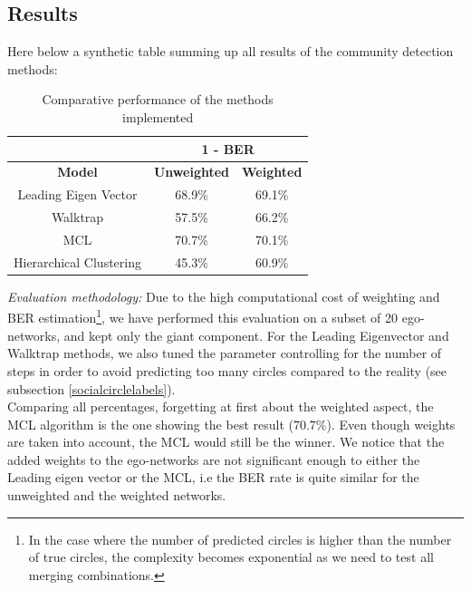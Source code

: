 \documentclass[11pt]{article}       %
\begin{document}
\subsection{Results}
Here below a synthetic table summing up all results of the community detection methods:

\begin{table}[H]
\centering
\begin{tabular}{c|c|c|}
\cline{2-3}
                                                    & \multicolumn{2}{c|}{\textbf{1 - BER}} \\ \hline
\multicolumn{1}{|c|}{\textbf{Model}}                         & \textbf{Unweighted}   & \textbf{Weighted}  \\ \hline
\multicolumn{1}{|c|}{Leading Eigen Vector}          & 68.9\%       & 69.1\%    \\ \hline
\multicolumn{1}{|c|}{Walktrap}                      & 57.5\%       & 66.2\%    \\ \hline
\multicolumn{1}{|c|}{MCL}                           & 70.7\%       & 70.1\%    \\ \hline
\multicolumn{1}{|c|}{Hierarchical Clustering} & 45.3\%          & 60.9\%       \\ \hline
\end{tabular}
\caption{Comparative performance of the methods implemented}
\end{table}
\newpage

\emph{Evaluation methodology:} Due to the high computational cost of weighting and BER estimation\footnote{In the case where the number of predicted circles is higher than the number of true circles, the complexity becomes exponential as we need to test all merging combinations.}, we have performed this evaluation on a subset of 20 ego-networks, and kept only the giant component. For the Leading Eigenvector and Walktrap methods, we also tuned the parameter controlling for the number of steps in order to avoid predicting too many circles compared to the reality (see subsection \ref{socialcirclelabels}).\\

Comparing all percentages, forgetting at first about the weighted aspect, the MCL algorithm is the one showing the best result (70.7\%). Even though weights are taken into account, the MCL would still be the winner. We notice that the added weights to the ego-networks are not significant enough to either the Leading eigen vector or the MCL, i.e the BER rate is quite similar for the unweighted and the weighted networks.\\
\end{document}
